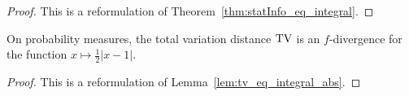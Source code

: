 \begin{proof}%
{}
This is a reformulation of Theorem~\ref{thm:statInfo_eq_integral}.
\end{proof}





\begin{lemma}
  \label{lem:tv_eq_fDiv}
  On probability measures, the total variation distance $\operatorname{TV}$ is an $f$-divergence for the function $x \mapsto \frac{1}{2}\vert x - 1 \vert$.
\end{lemma}

\begin{proof}%
{}
This is a reformulation of Lemma~\ref{lem:tv_eq_integral_abs}.
\end{proof}